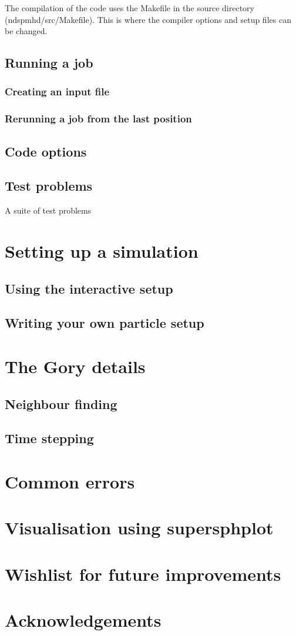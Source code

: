 \documentclass[a4paper,12pt]{article}
\begin{document}
 The compilation of the code uses the Makefile in the source directory
(ndspmhd/src/Makefile). This is where the compiler options and setup files can
be changed.

\subsection{Running a job}
\subsubsection{Creating an input file}

\subsubsection{Rerunning a job from the last position}

\subsection{Code options}

\subsection{Test problems}
 A suite of test problems

\section{Setting up a simulation}

\subsection{Using the interactive setup}

\subsection{Writing your own particle setup}

\section{The Gory details}

\subsection{Neighbour finding}

\subsection{Time stepping}

\section{Common errors}

\section{Visualisation using supersphplot}

\section{Wishlist for future improvements}

\section*{Acknowledgements}
\end{document}
